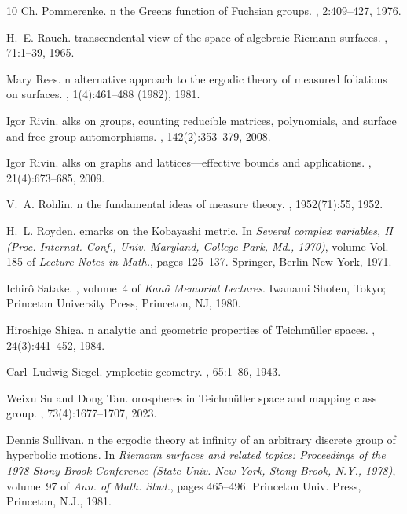 \documentclass[dvipdfmx]{amsart}
\theoremstyle{remark}
\begin{document}
\begin{thebibliography}{10}
Ch. Pommerenke.
n the {G}reen\textquotesingle s function of {F}uchsian groups.
, 2:409--427, 1976.

H.~E. Rauch.
 transcendental view of the space of algebraic {R}iemann surfaces.
, 71:1--39, 1965.

Mary Rees.
n alternative approach to the ergodic theory of measured foliations on surfaces.
, 1(4):461--488 (1982), 1981.

Igor Rivin.
alks on groups, counting reducible matrices, polynomials, and surface and free group automorphisms.
, 142(2):353--379, 2008.

Igor Rivin.
alks on graphs and lattices---effective bounds and applications.
, 21(4):673--685, 2009.

V.~A. Rohlin.
n the fundamental ideas of measure theory.
, 1952(71):55, 1952.

H.~L. Royden.
emarks on the {K}obayashi metric.
\newblock In {\em Several complex variables, II (Proc. Internat. Conf., Univ. Maryland, College Park, Md., 1970)}, volume Vol. 185 of {\em Lecture Notes in Math.}, pages 125--137. Springer, Berlin-New York, 1971.

Ichir{\^o} Satake.
, volume~4 of {\em Kan{\^o} Memorial Lectures}.
\newblock Iwanami Shoten, Tokyo; Princeton University Press, Princeton, NJ, 1980.

Hiroshige Shiga.
n analytic and geometric properties of {T}eichm{\"u}ller spaces.
, 24(3):441--452, 1984.

Carl~Ludwig Siegel.
ymplectic geometry.
, 65:1--86, 1943.

Weixu Su and Dong Tan.
orospheres in {T}eichm{\"u}ller space and mapping class group.
, 73(4):1677--1707, 2023.

Dennis Sullivan.
n the ergodic theory at infinity of an arbitrary discrete group of hyperbolic motions.
\newblock In {\em Riemann surfaces and related topics: Proceedings of the 1978 Stony Brook Conference (State Univ. New York, Stony Brook, N.Y., 1978)}, volume~97 of {\em Ann. of Math. Stud.}, pages 465--496. Princeton Univ. Press, Princeton, N.J., 1981.


\end{thebibliography}
\end{document}
